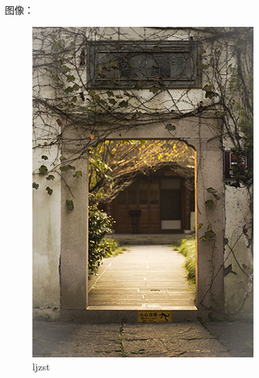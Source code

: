 图像：
\begin{figure}[htb]
	\centering 
	\includegraphics[scale=1.0]{./Pictures/test.jpg} 
	\caption{ljzst} 
\end{figure}

